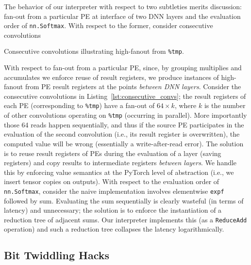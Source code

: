 The behavior of our interpreter with respect to two subtleties merits discussion: fan-out from a particular PE at interface of two DNN layers and the evaluation order of \texttt{nn.Softmax}.
With respect to the former, consider consecutive convolutions
\begin{mylisting}{Consecutive convolutions illustrating high-fanout from \texttt{\%tmp}.}
	
	\label{lst:consecutive_convs}
\end{mylisting}
With respect to fan-out from a particular PE, since, by grouping multiplies and accumulates we enforce reuse of result registers, we produce instances of high-fanout from PE result registers at the points \emph{between DNN layers}.
Consider the consecutive convolutions in Listing~\ref{lst:consecutive_convs}; the result registers of each PE (corresponding to \texttt{\%tmp}) have a fan-out of $64 \times k$, where $k$ is the number of other convolutions operating on \texttt{\%tmp} (occurring in parallel). 
More importantly those 64 reads happen sequentially, and thus if the source PE participates in the evaluation of the second convolution (i.e., its result register is overwritten), the computed value will be wrong (essentially a write-after-read error).
The solution is to reuse result registers of PEs during the evaluation of a layer (saving registers) and copy results to intermediate registers \emph{between layers}. 
We handle this by enforcing value semantics at the PyTorch level of abstraction (i.e., we insert tensor copies on outputs).
With respect to the evaluation order of \texttt{nn.Softmax}, consider the naive implementation involves elementwise \texttt{expf} followed by sum. 
Evaluating the sum sequentially is clearly wasteful (in terms of latency) and unnecessary; the solution is to enforce the instantiation of a reduction tree of adjacent sums.
Our interpreter implements this (as a \texttt{ReduceAdd} operation) and such a reduction tree collapses the latency logarithmically.

\subsection{Bit Twiddling Hacks}\label{subsec:bit-twiddling-hacks}


